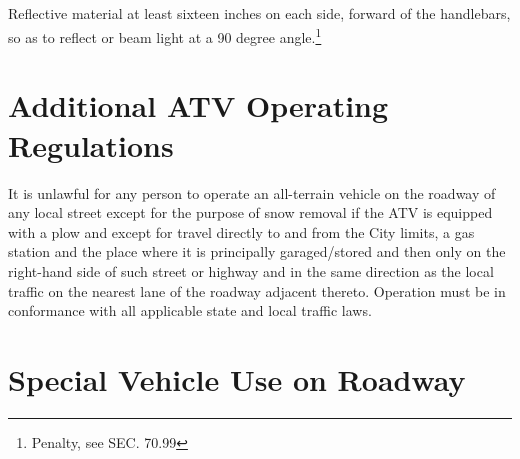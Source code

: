 \subsection{}
Reflective material at least sixteen inches on each side, forward of the handlebars, so as to reflect or beam light at a 90 degree angle.\footnote{Penalty, see SEC. 70.99}

\section{Additional ATV Operating Regulations}
It is unlawful for any person to operate an all-terrain vehicle on the roadway of any local street except for the purpose of snow removal if the ATV is equipped with a plow and except for travel directly to and from the City limits, a gas station and the place where it is principally garaged/stored and then only on the right-hand side of such street or highway and in the same direction as the local traffic on the nearest lane of the roadway adjacent thereto. Operation must be in conformance with all applicable state and local traffic laws.\\


\setcounter{section}{29}
\section{Special Vehicle Use on Roadway}

